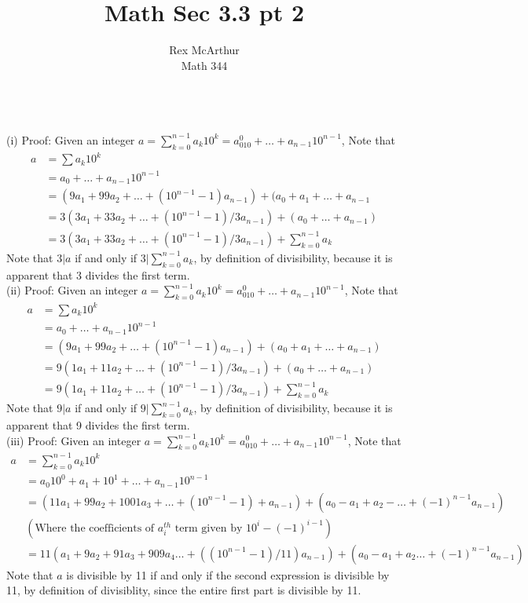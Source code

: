 \documentclass[letterpaper,12pt]{article}
\title{Math Sec 3.3 pt 2}
\author{Rex McArthur\\Math 344}
\theoremstyle{definition}
\begin{document}
\maketitle
{}\\

(i)
Proof: Given an integer $a = \sum^{n-1}_{k=0} a_k10^k = a_010^0+\dots+
    a_{n-1}10^{n-1}$, Note that\\
        \begin{align*}
            a &= \sum{a_k10^k}\\
            & = a_0+\dots+a_{n-1}10^{n-1}\\
            & = (9a_1 + 99a_2 + \dots +(10^{n-1}-1)a_{n-1}) + (a_0 + a_1 + \dots
                + a_{n-1}\\
            & = 3(3a_1 + 33 a_2 + \dots +  (10^{n-1} -1)/3 a_{n-1}) + 
            (a_0+\dots+a_{n-1})\\
            & = 3(3a_1 + 33 a_2 + \dots +  (10^{n-1} -1)/3 a_{n-1}) + 
            \sum^{n-1}_{k=0} a_k
        \end{align*}
    Note that $3|a$ if and only if $3|\sum^{n-1}_{k=0} a_k$, by definition of 
    divisibility, because it is apparent that 3 divides the first term.\\
(ii)
Proof: Given an integer $a = \sum^{n-1}_{k=0} a_k10^k = a_010^0+\dots+
    a_{n-1}10^{n-1}$, Note that\\
        \begin{align*}
            a &= \sum{a_k10^k}\\
            & = a_0+\dots+a_{n-1}10^{n-1}\\
            & = (9a_1 + 99a_2 + \dots +(10^{n-1}-1)a_{n-1}) + (a_0 + a_1 + \dots
                + a_{n-1})\\
            & = 9(1a_1 + 11 a_2 + \dots +  (10^{n-1} -1)/3 a_{n-1}) + 
            (a_0+\dots+a_{n-1})\\
            & = 9(1a_1 + 11 a_2 + \dots +  (10^{n-1} -1)/3 a_{n-1}) + 
            \sum^{n-1}_{k=0} a_k
        \end{align*}
    Note that $9|a$ if and only if $9|\sum^{n-1}_{k=0} a_k$, by definition of 
    divisibility, because it is apparent that 9 divides the first term.\\
(iii)
Proof: Given an integer $a = \sum^{n-1}_{k=0} a_k10^k = a_010^0+\dots+
    a_{n-1}10^{n-1}$, Note that\\
\begin{align*}
    a &= \sum^{n-1}_{k = 0} a_k 10^k \\
    & = a_0 10^0 + a_1 + 10^1 + \dots + a_{n-1} 10^{n-1}\\
    & = (11a_1 + 99a_2 + 1001a_3 + \dots + (10^{n-1}-1)+a_{n-1}) + (a_0 - a_1 + 
        a_2 - \dots + (-1)^{n-1} a_{n-1})\\
   &(\text{Where the coefficients of $a_i^{th}$ term given by $10^{i}-(-1)^{i-1}$})\\
   & = 11(a_1 + 9a_2+91a_3+909a_4\dots+( (10^{n-1}-1)/11)a_{n-1})+(a_0-a_1+a_2\dots
        +(-1)^{n-1}a_{n-1})
\end{align*}
Note that $a$ is divisible by 11 if and only if the second expression is divisible
by 11, by definition of divisiblity, since the entire first part is divisible by 11.

\\
\end{document}
